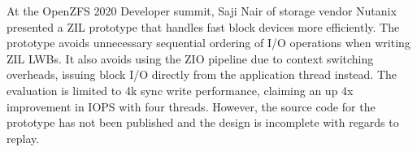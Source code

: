 \documentclass[12pt,a4paper,twoside]{book}
\begin{document}
At the OpenZFS 2020 Developer summit, Saji Nair of storage vendor Nutanix presented a ZIL prototype that handles fast block devices more efficiently.
The prototype avoids unnecessary sequential ordering of I/O operations when writing ZIL LWBs.
It also avoids using the ZIO pipeline due to context switching overheads, issuing block I/O directly from the application thread instead.
The evaluation is limited to 4k sync write performance, claiming an up 4x improvement in IOPS with four threads.
However, the source code for the prototype has not been published and the design is incomplete with regards to replay.
\end{document}
